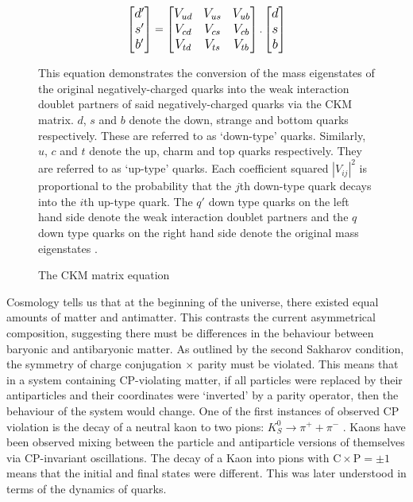 \documentclass[10pt]{article}
\begin{document}
\begin{figure}
	\begin{equation*}
	\large
	\begin{bmatrix}
	d' \\
	s' \\
	b' \\
	\end{bmatrix}
	=
	\begin{bmatrix}
	V_{ud} & V_{us} & V_{ub} \\
	V_{cd} & V_{cs} & V_{cb} \\
	V_{td} & V_{ts} & V_{tb} \\
	\end{bmatrix}
	.
	\begin{bmatrix}
	d \\
	s \\
	b \\
	\end{bmatrix}
	\end{equation*}
	\caption{The CKM matrix equation}{This equation demonstrates the conversion of the mass eigenstates of the original negatively-charged quarks into the weak interaction doublet partners of said negatively-charged quarks via the CKM matrix. $d$, $s$ and $b$ denote the down, strange and bottom quarks respectively. These are referred to as `down-type' quarks. Similarly, $u$, $c$ and $t$ denote the up, charm and top quarks respectively. They are referred to as `up-type' quarks. Each coefficient squared $|V_{ij}|^2$ is proportional to the probability that the $j$th down-type quark decays into the $i$th up-type quark. The $q'$ down type quarks on the left hand side denote the weak interaction doublet partners and the $q$ down type quarks on the right hand side denote the original mass eigenstates \cite{particle2020review}.}
	\label{CKM_eq}
\end{figure}

Cosmology tells us that at the beginning of the universe, there existed equal amounts of matter and antimatter. This contrasts the current asymmetrical composition, suggesting there must be differences in the behaviour between baryonic and antibaryonic matter. As outlined by the second Sakharov condition, the symmetry of charge conjugation $\times$ parity must be violated. This means that in a system containing CP-violating matter, if all particles were replaced by their antiparticles and their coordinates were `inverted' by a parity operator, then the behaviour of the system would change. One of the first instances of observed CP violation is the decay of a neutral kaon to two pions: $K^0_S \rightarrow \pi^+ + \pi^-$ \cite{sachs1964cp}. Kaons have been observed mixing between the particle and antiparticle versions of themselves via CP-invariant oscillations. The decay of a Kaon into pions with $\text{C} \times \text{P} = \pm 1$ means that the initial and final states were different. This was later understood in terms of the dynamics of quarks.
\end{document}
